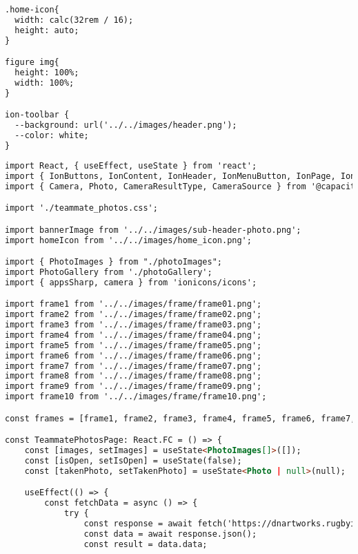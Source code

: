 \begin{lstlisting}[language=HTML, caption=latest\_news.css]
.home-icon{
  width: calc(32rem / 16);
  height: auto;
}

figure img{
  height: 100%;
  width: 100%;
}

ion-toolbar {
  --background: url('../../images/header.png');
  --color: white;
}
\end{lstlisting}

\begin{lstlisting}[language=HTML, caption=teammate\_photos.tsx]
import React, { useEffect, useState } from 'react';
import { IonButtons, IonContent, IonHeader, IonMenuButton, IonPage, IonTitle, IonToolbar, IonButton, IonIcon, IonModal, IonCol } from '@ionic/react';
import { Camera, Photo, CameraResultType, CameraSource } from '@capacitor/camera';

import './teammate_photos.css';

import bannerImage from '../../images/sub-header-photo.png';
import homeIcon from '../../images/home_icon.png';

import { PhotoImages } from "./photoImages";
import PhotoGallery from './photoGallery';
import { appsSharp, camera } from 'ionicons/icons';

import frame1 from '../../images/frame/frame01.png';
import frame2 from '../../images/frame/frame02.png';
import frame3 from '../../images/frame/frame03.png';
import frame4 from '../../images/frame/frame04.png';
import frame5 from '../../images/frame/frame05.png';
import frame6 from '../../images/frame/frame06.png';
import frame7 from '../../images/frame/frame07.png';
import frame8 from '../../images/frame/frame08.png';
import frame9 from '../../images/frame/frame09.png';
import frame10 from '../../images/frame/frame10.png';

const frames = [frame1, frame2, frame3, frame4, frame5, frame6, frame7, frame8, frame9, frame10];

const TeammatePhotosPage: React.FC = () => {
    const [images, setImages] = useState<PhotoImages[]>([]);
    const [isOpen, setIsOpen] = useState(false);
    const [takenPhoto, setTakenPhoto] = useState<Photo | null>(null);

    useEffect(() => {
        const fetchData = async () => {
            try {
                const response = await fetch('https://dnartworks.rugbyindonesia.or.id/indonesianrugby/photos/list.json');
                const data = await response.json();
                const result = data.data;


\end{lstlisting}
